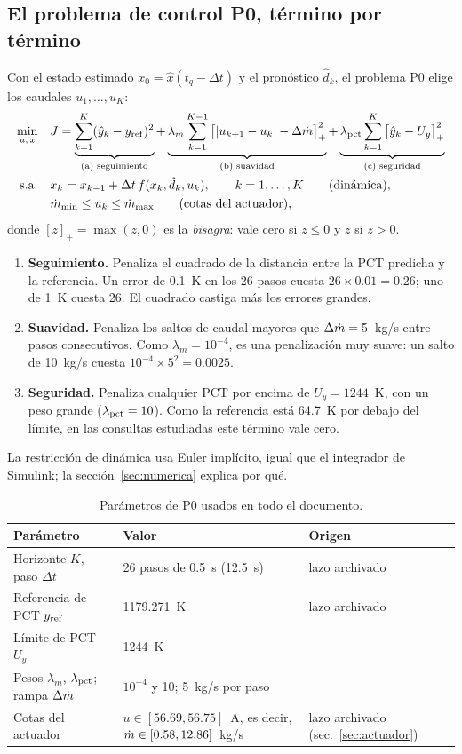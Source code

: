 \subsection{El problema de control P0, término por término}\label{sec:modelo}
Con el estado estimado $x_0=\hat x(t_q-\Delta t)$ y el pronóstico $\hat d_k$, el problema P0
elige los caudales $u_1,\dots,u_K$:
\begin{align*}
\min_{u,\,x}\quad & J=\underbrace{\sum_{k=1}^{K}(\hat y_k-y_{\rm ref})^2}_{\text{(a) seguimiento}}
  +\underbrace{\lambda_m\sum_{k=1}^{K-1}\big[|u_{k+1}-u_k|-\Delta\dot m\big]_+^2}_{\text{(b) suavidad}}
  +\underbrace{\lambda_{\rm pct}\sum_{k=1}^{K}\big[\hat y_k-U_y\big]_+^2}_{\text{(c) seguridad}}\\
\text{s.a.}\quad & x_k=x_{k-1}+\Delta t\,f(x_k,\hat d_k,u_k),\qquad k=1,\dots,K\qquad\text{(dinámica)},\\
& \dot m_{\rm min}\le u_k\le\dot m_{\rm max}\qquad\text{(cotas del actuador)},
\end{align*}
donde $[z]_+=\max(z,0)$ es la \emph{bisagra}: vale cero si $z\le0$ y $z$ si $z>0$.
\begin{enumerate}[label=(\alph*)]
  \item \textbf{Seguimiento.} Penaliza el cuadrado de la distancia entre la PCT predicha y la
        referencia. Un error de 0.1~K en los 26 pasos cuesta $26\times0.01=0.26$; uno de 1~K
        cuesta 26. El cuadrado castiga más los errores grandes.
  \item \textbf{Suavidad.} Penaliza los saltos de caudal mayores que $\Delta\dot m=5$~kg/s entre
        pasos consecutivos. Como $\lambda_m=10^{-4}$, es una penalización muy suave: un salto de
        10~kg/s cuesta $10^{-4}\times5^2=0.0025$.
  \item \textbf{Seguridad.} Penaliza cualquier PCT por encima de $U_y=1244$~K, con un peso
        grande ($\lambda_{\rm pct}=10$). Como la referencia está 64.7~K por debajo del límite,
        en las consultas estudiadas este término vale cero.
\end{enumerate}
La restricción de dinámica usa Euler implícito, igual que el integrador de Simulink; la
sección~\ref{sec:numerica} explica por qué.

\begin{table}[H]\centering\small
\begin{tabularx}{\linewidth}{@{}l Y l@{}}\toprule
Parámetro & Valor & Origen\\\midrule
Horizonte $K$, paso $\Delta t$ & 26 pasos de 0.5~s (12.5~s) & lazo archivado\\
Referencia de PCT $y_{\rm ref}$ & 1179.271~K & lazo archivado\\
Límite de PCT $U_y$ & 1244~K & \\
Pesos $\lambda_m$, $\lambda_{\rm pct}$; rampa $\Delta\dot m$ & $10^{-4}$ y 10; 5~kg/s por paso & \\
Cotas del actuador & $u\in[56.69,56.75]$~A, es decir, $\dot m\in[0.58,12.86]$~kg/s & lazo archivado (sec.~\ref{sec:actuador})\\\bottomrule
\end{tabularx}
\caption{Parámetros de P0 usados en todo el documento.}
\end{table}

